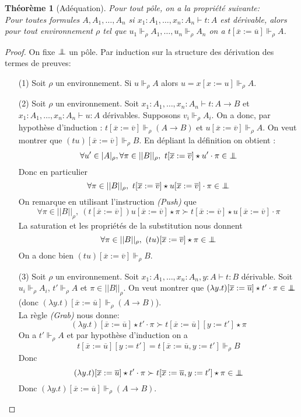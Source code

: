 \documentclass[a4paper,12pt]{article}
\newtheorem{theo}{Théorème}[subsection]
\theoremstyle{rmqstyle}
\newcommand{\abs}[1]{\lvert#1\rvert}
\newcommand{\abss}[1]{\lvert \lvert#1\rvert \rvert}
\newcommand{\pole}{{\protect\mathpalette{\protect\polehelper}{\bot}}} \def\polehelper#1#2{\mathrel{\rlap{$#1#2$}\mkern3mu{#1#2}}}
\renewcommand{\bar}{\overline}
\begin{document}
\begin{theo}[Adéquation]
\label{ade}
Pour tout pôle, on a la propriété suivante:\\
Pour toutes formules $A, A_1, \dots, A_n$ si $x_1 : A_1, \dots, x_n : A_n \vdash t : A$ est dérivable, alors pour tout environnement $\rho$ tel que $u_1 \Vdash_\rho A_1,  \dots, u_n \Vdash_\rho A_n$ on a $t[ \bar{x} := \bar{u}] \Vdash_\rho A$.
\end{theo}

\begin{proof}
On fixe $\pole$ un pôle. Par induction sur la structure des dérivation des termes de preuves:
\begin{itemize}
\setlength\itemsep{ -1 em}
\item[(1)] Soit $\rho$ un environnement. Si $u \Vdash_\rho A$ alors $u = x[x := u] \Vdash_\rho A$.\\

\item[(2)] Soit $\rho$ un environnement. Soit $x_1 : A_1, \dots, x_n : A_n \vdash t : A \to B$ et $x_1 : A_1, \dots, x_n : A_n \vdash u : A$ dérivables. Supposons $v_i \Vdash_\rho A_i$. On a donc, par hypothèse d'induction : $t[ \bar{x} := \bar{v}] \Vdash_\rho (A \to B)$ et $u[\bar{x} := \bar{v}] \Vdash_\rho A$. On veut montrer que $(tu)[\bar{x} := \bar{v}] \Vdash_\rho B$. En dépliant la définition on obtient : 
$$\forall u' \in \abs{A}_\rho, \forall \pi \in \abss{B}_\rho, \ t[\bar{x} := \bar{v}] \star u' \cdot \pi \in \pole$$
Donc en particulier
$$ \forall \pi \in \abss{B}_\rho, \ t[\bar{x} := \bar{v}] \star u[\bar{x} := \bar{v}] \cdot \pi \in \pole$$
On remarque en utilisant l'instruction \textit{(Push)} que 
$$\forall \pi \in \abss{B}_\rho, \ (t[\bar{x} := \bar{v}])u[\bar{x} := \bar{v}] \star \pi \succ t[\bar{x} := \bar{v}] \star u[\bar{x} := \bar{v}] \cdot \pi$$
La saturation et les propriétés de la substitution nous donnent 
$$\forall \pi \in \abss{B}_\rho, \ (tu)[\bar{x} := \bar{v}] \star \pi \in \pole$$
On a donc bien $(tu)[\bar{x} := \bar{v}] \Vdash_\rho B$.\\

\item[(3)] Soit $\rho$ un environnement. Soit $x_1 : A_1, \dots, x_n : A_n, y : A \vdash t : B$ dérivable. Soit $u_i \Vdash_\rho A_i$, $t' \Vdash_\rho A$ et $\pi \in \abss{B}_\rho$. On veut montrer que $(\lambda y.t)[\bar{x} := \bar{u}] \star t' \cdot \pi \in \pole$ (donc $(\lambda y.t)[\bar{x} := \bar{u}] \Vdash_\rho (A \to B)$).\\
La règle \textit{(Grab)} nous donne:
$$(\lambda y.t)[\bar{x} := \bar{u}] \star t' \cdot \pi \succ  t[\bar{x} := \bar{u}][y := t'] \star \pi $$
On a $t' \Vdash_\rho A$ et par hypothèse d'induction on a
$$t[\bar{x} := \bar{u}][y := t'] = t[\bar{x} := \bar{u}, y := t'] \Vdash_\rho B$$
Donc
$$(\lambda y.t)[\bar{x} := \bar{u}] \star t' \cdot \pi \succ  t[\bar{x} := \bar{u}, y := t'] \star \pi \in \pole$$
Donc $(\lambda y.t)[\bar{x} := \bar{u}] \Vdash_\rho (A \to B)$.\\


\end{itemize}
\end{proof}
\end{document}
